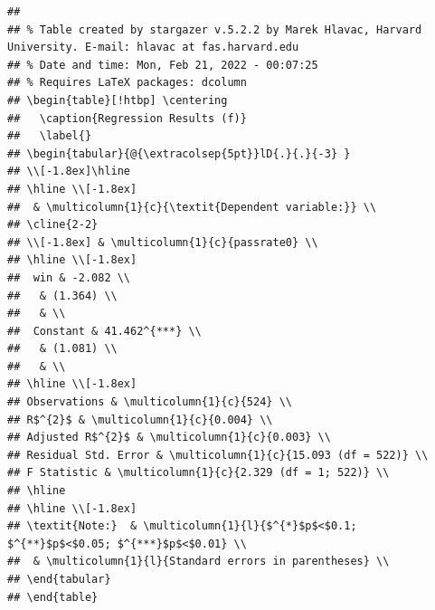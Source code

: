 \documentclass[
  12pt,
  landscape]{article}
\begin{document}
\begin{verbatim}
## 
## % Table created by stargazer v.5.2.2 by Marek Hlavac, Harvard University. E-mail: hlavac at fas.harvard.edu
## % Date and time: Mon, Feb 21, 2022 - 00:07:25
## % Requires LaTeX packages: dcolumn 
## \begin{table}[!htbp] \centering 
##   \caption{Regression Results (f)} 
##   \label{} 
## \begin{tabular}{@{\extracolsep{5pt}}lD{.}{.}{-3} } 
## \\[-1.8ex]\hline 
## \hline \\[-1.8ex] 
##  & \multicolumn{1}{c}{\textit{Dependent variable:}} \\ 
## \cline{2-2} 
## \\[-1.8ex] & \multicolumn{1}{c}{passrate0} \\ 
## \hline \\[-1.8ex] 
##  win & -2.082 \\ 
##   & (1.364) \\ 
##   & \\ 
##  Constant & 41.462^{***} \\ 
##   & (1.081) \\ 
##   & \\ 
## \hline \\[-1.8ex] 
## Observations & \multicolumn{1}{c}{524} \\ 
## R$^{2}$ & \multicolumn{1}{c}{0.004} \\ 
## Adjusted R$^{2}$ & \multicolumn{1}{c}{0.003} \\ 
## Residual Std. Error & \multicolumn{1}{c}{15.093 (df = 522)} \\ 
## F Statistic & \multicolumn{1}{c}{2.329 (df = 1; 522)} \\ 
## \hline 
## \hline \\[-1.8ex] 
## \textit{Note:}  & \multicolumn{1}{l}{$^{*}$p$<$0.1; $^{**}$p$<$0.05; $^{***}$p$<$0.01} \\ 
##  & \multicolumn{1}{l}{Standard errors in parentheses} \\ 
## \end{tabular} 
## \end{table}
\end{verbatim}
\end{document}
